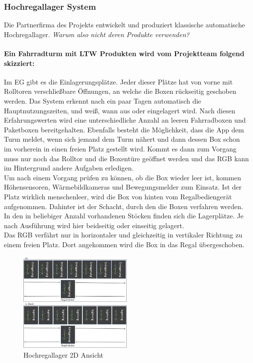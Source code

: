 \subsubsection{Hochregallager System}
Die Partnerfirma des Projekts entwickelt und produziert klassische automatische Hochregallager. \textit{Warum also nicht deren Produkte verwenden?}

\paragraph{Ein Fahrradturm mit LTW Produkten wird vom Projektteam folgend skizziert:}
Im EG gibt es die Einlagerungsplätze. Jeder dieser Plätze hat von vorne mit Rolltoren verschließbare Öffnungen, an welche die Boxen rückseitig geschoben werden. Das System erkennt nach ein paar Tagen automatisch die Hauptnutzungszeiten, und weiß, wann aus oder eingelagert wird. Nach diesen Erfahrungswerten wird eine unterschiedliche Anzahl an leeren Fahrradboxen und Paketboxen bereitgehalten. Ebenfalls besteht die Möglichkeit, dass die App dem Turm meldet, wenn sich jemand dem Turm nähert und dann dessen Box schon im vorherein in einen freien Platz gestellt wird. Kommt es dann zum Vorgang muss nur noch das Rolltor und die Boxentüre geöffnet werden und das RGB kann im Hintergrund andere Aufgaben erledigen.\\
Um nach einem Vorgang prüfen zu können, ob die Box wieder leer ist, kommen Höhensensoren, Wärmebildkameras und Bewegungsmelder zum Einsatz. Ist der Platz wirklich menschenleer, wird die Box von hinten vom Regalbediengerät aufgenommen. Dahinter ist der Schacht, durch den die Boxen verfahren werden. In den in beliebiger Anzahl vorhandenen Stöcken finden sich die Lagerplätze. Je nach Ausführung wird hier beidseitig oder einseitig gelagert.\\
Das RGB verfährt nur in horizontaler und gleichzeitig in vertikaler Richtung zu einem freien Platz. Dort angekommen wird die Box in das Regal übergeschoben.

\begin{figure}[H]
    \centering
    \includegraphics[width=0.5\textwidth]{images/hochregallager2d.jpg}
    \caption{Hochregallager 2D Ansicht}
    \label{fig:hochregallager2d}
\end{figure}

